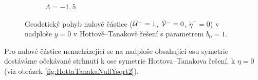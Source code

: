 \begin{figure}[ht]
\begin{subfigure}[b]{0.45\textwidth}
        \caption{$\Lambda = -1,5$}
    \end{subfigure}
    \caption{Geodetický pohyb nulové částice ($\dot {\mathcal{U}}^-=1$, $\dot {\mathcal{V}}^-=0$, $\dot \eta^-=0$) v nadploše $y = 0$ v Hottově--Tanakově řešení s parametrem $b_0 = 1$.}
    \label{fig:HottaTanakaNullY0}
\end{figure}

Pro nulové částice nenacházející se na nadploše obsahující osu symetrie dostáváme očekávané strhnutí k
ose symetrie Hottova--Tanakova řešení, k $\eta=0$ (viz obrázek \ref{fig:HottaTanakaNullYsqrt2}). 

